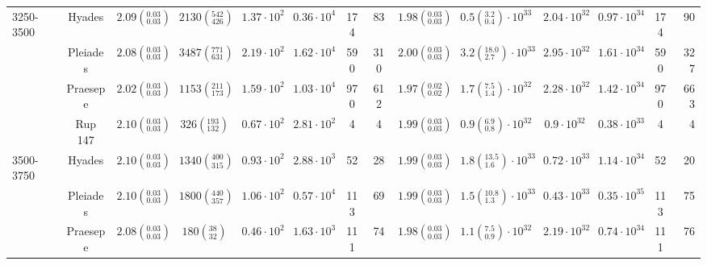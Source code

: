 \begin{tabular}{lccccccccccccr}
3250-3500 & Hyades &  $2.09\left(^{0.03}_{0.03}\right)$ &    $2130\left(^{542}_{426}\right)$ &    $1.37\cdot 10^{2}$ &    $0.36\cdot 10^{4}$ &                174 &                 83 &  $1.98\left(^{0.03}_{0.03}\right)$ &   $0.5\left(^{3.2}_{0.4}\right)\cdot 10^{33}$ &       $2.04\cdot 10^{32}$ &       $0.97\cdot 10^{34}$ &                  174 &                   90 \\
          & Pleiades &  $2.08\left(^{0.03}_{0.03}\right)$ &    $3487\left(^{771}_{631}\right)$ &    $2.19\cdot 10^{2}$ &    $1.62\cdot 10^{4}$ &                590 &                310 &  $2.00\left(^{0.03}_{0.03}\right)$ &  $3.2\left(^{18.0}_{2.7}\right)\cdot 10^{33}$ &       $2.95\cdot 10^{32}$ &       $1.61\cdot 10^{34}$ &                  590 &                  327 \\
          & Praesepe &  $2.02\left(^{0.03}_{0.03}\right)$ &    $1153\left(^{211}_{173}\right)$ &    $1.59\cdot 10^{2}$ &    $1.03\cdot 10^{4}$ &                970 &                612 &  $1.97\left(^{0.02}_{0.02}\right)$ &   $1.7\left(^{7.5}_{1.4}\right)\cdot 10^{32}$ &       $2.28\cdot 10^{32}$ &       $1.42\cdot 10^{34}$ &                  970 &                  663 \\
          & Rup 147 &  $2.10\left(^{0.03}_{0.03}\right)$ &     $326\left(^{193}_{132}\right)$ &    $0.67\cdot 10^{2}$ &    $2.81\cdot 10^{2}$ &                  4 &                  4 &  $1.99\left(^{0.03}_{0.03}\right)$ &   $0.9\left(^{6.9}_{0.8}\right)\cdot 10^{32}$ &        $0.9\cdot 10^{32}$ &       $0.38\cdot 10^{33}$ &                    4 &                    4 \\
3500-3750 & Hyades &  $2.10\left(^{0.03}_{0.03}\right)$ &    $1340\left(^{400}_{315}\right)$ &    $0.93\cdot 10^{2}$ &    $2.88\cdot 10^{3}$ &                 52 &                 28 &  $1.99\left(^{0.03}_{0.03}\right)$ &  $1.8\left(^{13.5}_{1.6}\right)\cdot 10^{33}$ &       $0.72\cdot 10^{33}$ &       $1.14\cdot 10^{34}$ &                   52 &                   20 \\
          & Pleiades &  $2.10\left(^{0.03}_{0.03}\right)$ &    $1800\left(^{440}_{357}\right)$ &    $1.06\cdot 10^{2}$ &    $0.57\cdot 10^{4}$ &                113 &                 69 &  $1.99\left(^{0.03}_{0.03}\right)$ &  $1.5\left(^{10.8}_{1.3}\right)\cdot 10^{33}$ &       $0.43\cdot 10^{33}$ &       $0.35\cdot 10^{35}$ &                  113 &                   75 \\
          & Praesepe &  $2.08\left(^{0.03}_{0.03}\right)$ &       $180\left(^{38}_{32}\right)$ &    $0.46\cdot 10^{2}$ &    $1.63\cdot 10^{3}$ &                111 &                 74 &  $1.98\left(^{0.03}_{0.03}\right)$ &   $1.1\left(^{7.5}_{0.9}\right)\cdot 10^{32}$ &       $2.19\cdot 10^{32}$ &       $0.74\cdot 10^{34}$ &                  111 &                   76 \\

\end{tabular}
